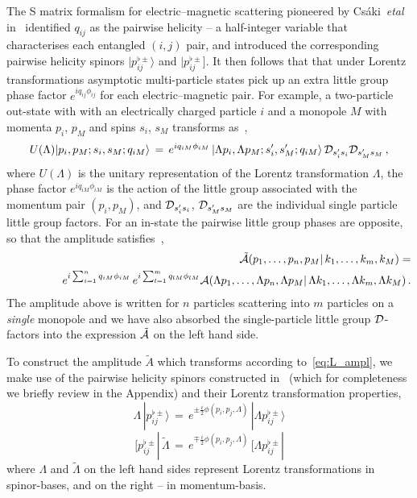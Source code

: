 \documentclass[a4paper,11pt]{article}
\begin{document}
The S matrix formalism for electric--magnetic scattering pioneered by
Cs\'aki~{\it etal} in~\cite{Csaki:2020inw} 
identified $q_{ij}$ as the pairwise helicity -- a half-integer variable that characterises each entangled $(i,j)$ pair, and introduced the corresponding 
pairwise helicity spinors $|p^{\flat \pm}_{ij}\rangle$ and  $|p^{\flat \pm}_{ij}]$.
It then follows that that under Lorentz transformations asymptotic multi-particle states pick up an extra little group phase factor $e^{i q_{ij} \phi_{ij}}$
for each electric--magnetic pair. For example, a two-particle out-state with with an electrically charged particle $i$ and a monopole $M$ with momenta 
$p_i$, $p_M$ and spins $s_i$, $s_M$ 
transforms as~\cite{Csaki:2020inw},
\begin{equation}
U(\Lambda) |p_i,p_M; s_i, s_M; q_{iM}\rangle\,=\, e^{i q_{iM} \phi_{iM}} \,  |\Lambda p_i,\Lambda p_M; s'_i, s'_M; q_{iM}\rangle \, {\cal D}_{s'_i s_i} {\cal D}_{s'_M s_M}\,,
\end{equation}
where $U(\Lambda)$ is the unitary representation of the Lorentz transformation $\Lambda$, the phase factor $e^{i q_{iM}\phi_{iM}}$ is the action of the little group 
associated with the momentum pair $(p_i, p_M)$, and ${\cal D}_{s'_i s_i}$,  ${\cal D}_{s'_M s_M}$ are the individual single particle little group factors. 
For an in-state the pairwise little group phases are opposite, so that the amplitude
satisfies~\cite{Csaki:2020inw},
\begin{eqnarray}
\label{eq:L_ampl}
&&\tilde{\cal A} (p_1, \ldots, p_n, p_M |\, k_1, \ldots, k_m, k_M) = 
\\
&&\qquad \qquad e^{i \sum_{i=1}^n q_{iM} \phi_{iM}} \, e^{i \sum_{l=1}^m q_{lM} \phi_{lM}}
{\cal A} (\Lambda p_1, \ldots, \Lambda p_n, \Lambda p_M |\, \Lambda k_1, \ldots, \Lambda k_m, \Lambda k_M)
\,. \nonumber
\end{eqnarray}
The amplitude above is written for $n$ particles scattering into $m$ particles on a {\it single} monopole and we have also absorbed the 
 single-particle little group ${\cal D}$-factors into the expression $\tilde{\cal A}$ on the left hand side.

To construct the amplitude $\tilde{A}$ which transforms according to~\eqref{eq:L_ampl}, we make use of the pairwise helicity spinors constructed in~\cite{Csaki:2020inw}
(which for completeness we briefly review in the Appendix) and their Lorentz transformation properties,
\begin{equation}
\label{eq:pb>tr}
\Lambda \, |p^{\flat \pm}_{ij}\rangle \,=\, e^{ \pm \frac{i}{2}\phi(p_i,p_j,\Lambda)} \, |\Lambda p^{\flat \pm}_{ij}\rangle 
\end{equation}
\begin{equation}
\label{eq:pb]tr}
[p^{\flat \pm}_{ij} | \, \tilde\Lambda \,=\, e^{ \mp \frac{i}{2}\phi(p_i,p_j,\Lambda)} \, [\Lambda p^{\flat \pm}_{ij} | 
\end{equation}
where $\Lambda$ and $\tilde\Lambda$ on the left hand sides represent Lorentz transformations in spinor-bases,  and on the right --  in momentum-basis.
\end{document}
